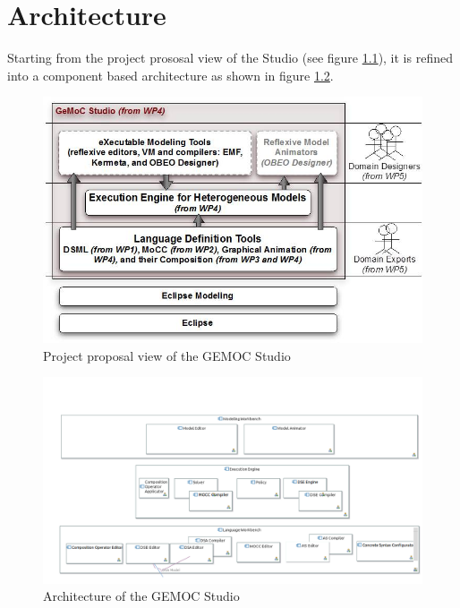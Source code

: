 \documentclass{gemoc} %
\begin{document}
\chapter{Architecture}
Starting from the project prososal view of the Studio (see figure \ref{fig:ProjectProposalView}), it is refined into a component based architecture as shown in figure \ref{fig:GlobalView}. 
\begin{figure}[htp]
	\begin{center}
	\includegraphics*[trim=0.0cm 0.0cm 0cm 0.0cm, clip=true, width=1.0\linewidth]{../images/ProjectProposalView.jpg}
	\caption{Project proposal view of the GEMOC Studio}
	\label{fig:ProjectProposalView}
	\end{center}
\end{figure}
\begin{figure}[htp]
	\begin{center}
	\includegraphics*[trim=0.0cm 0.0cm 0cm 0.0cm, clip=true, width=1.0\linewidth]{../images/generated/Global View.png}
	\caption{Architecture of the GEMOC Studio}
	\label{fig:GlobalView}
	\end{center}
\end{figure}
\end{document}

